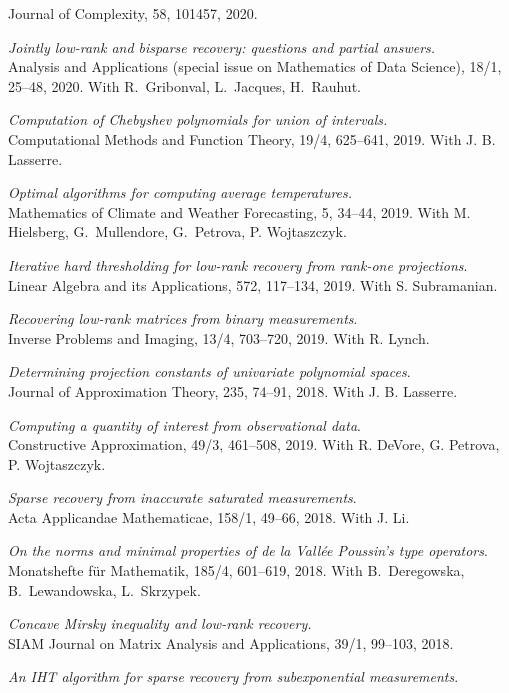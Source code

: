 \documentclass[11pt]{article}
\begin{document}
Journal of Complexity, 58, 101457, 2020.
\item {\sl Jointly low-rank and bisparse recovery: questions and partial answers.}\\
Analysis and Applications (special issue on Mathematics of Data Science), 18/1, 25--48, 2020.
With R.~Gribonval, L.~Jacques, H.~Rauhut.
\item {\sl Computation of Chebyshev polynomials for union of intervals.}\\
Computational Methods and Function Theory, 19/4, 625--641, 2019.
With J. B. Lasserre.
\item {\sl Optimal algorithms for computing average temperatures.}\\
Mathematics of Climate and Weather Forecasting, 5, 34--44, 2019.
With M. Hielsberg, G.~Mullendore, G.~Petrova, P. Wojtaszczyk.
\item {\sl Iterative hard thresholding for low-rank recovery from rank-one projections}.\\
Linear Algebra and its Applications, 572, 117--134, 2019. With S. Subramanian.
\item {\sl Recovering low-rank matrices from binary measurements}.\\
Inverse Problems and Imaging, 13/4, 703--720, 2019. 
With R. Lynch. 
\item {\sl Determining projection constants of univariate polynomial spaces}.\\
Journal of Approximation Theory, 235, 74--91, 2018.
With J. B. Lasserre.
\item {\sl Computing a quantity of interest from observational data}.\\
Constructive Approximation, 49/3, 461--508, 2019. With R. DeVore, G. Petrova, P. Wojtaszczyk.
\item {\sl Sparse recovery from inaccurate saturated measurements}.\\
Acta Applicandae Mathematicae, 158/1, 49--66, 2018. With J. Li.
\item {\sl On the norms and minimal properties of de la Vall\'ee Poussin's type operators}.\\
Monatshefte f\"ur Mathematik, 185/4, 601--619, 2018. With B.~Deregowska, B.~Lewandowska, L.~Skrzypek.
\item {\sl Concave Mirsky inequality and low-rank recovery.}\\
SIAM Journal on Matrix Analysis and Applications, 39/1, 99--103, 2018.
\item {\sl An IHT algorithm for sparse recovery from subexponential measurements}.\\
\end{document}
